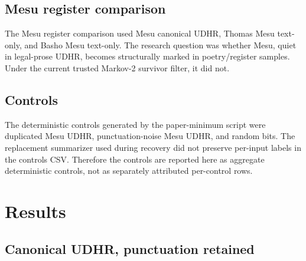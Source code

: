 \documentclass[11pt,a4paper]{article}
\begin{document}
\subsection{Mesu register comparison}
The Mesu register comparison used Mesu canonical UDHR, Thomas Mesu text-only, and Basho Mesu text-only. The research question was whether Mesu, quiet in legal-prose UDHR, becomes structurally marked in poetry/register samples. Under the current trusted Markov-2 survivor filter, it did not.

\subsection{Controls}
The deterministic controls generated by the paper-minimum script were duplicated Mesu UDHR, punctuation-noise Mesu UDHR, and random bits. The replacement summarizer used during recovery did not preserve per-input labels in the controls CSV. Therefore the controls are reported here as aggregate deterministic controls, not as separately attributed per-control rows.


\section{Results}
\subsection{Canonical UDHR, punctuation retained}
\end{document}
